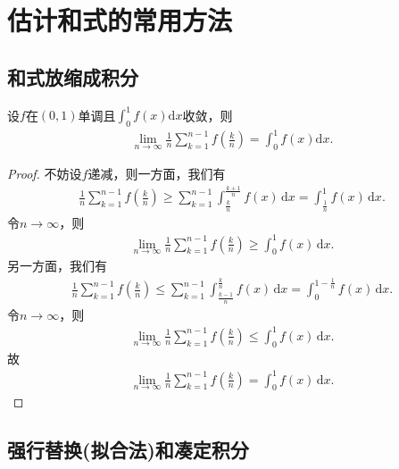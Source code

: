 \documentclass[../../main.tex]{subfiles}%
\begin{document}
\section{估计和式的常用方法}

\subsection{和式放缩成积分}

\begin{proposition}
设\(f\)在\((0,1)\)单调且\(\int_{0}^{1} f(x) \mathrm{d}x\)收敛，则
\begin{align*}
\lim_{n \to \infty} \frac{1}{n} \sum\limits_{k = 1}^{n - 1} f\left(\frac{k}{n}\right) = \int_{0}^{1} f(x)\mathrm{d}x.
\end{align*}
\end{proposition}
\begin{proof}

不妨设\(f\)递减，则一方面，我们有
\begin{align*}
\frac{1}{n}\sum\limits_{k=1}^{n-1}f\left(\frac{k}{n}\right) \geqslant \sum\limits_{k=1}^{n-1}\int_{\frac{k}{n}}^{\frac{k+1}{n}}f(x) \, \mathrm{d}x = \int_{\frac{1}{n}}^1 f(x) \, \mathrm{d}x.
\end{align*}
令\(n \to \infty\)，则
\begin{align*}
\lim_{n \to \infty} \frac{1}{n}\sum\limits_{k=1}^{n-1}f\left(\frac{k}{n}\right) \geqslant \int_0^1 f(x) \, \mathrm{d}x.
\end{align*}
另一方面，我们有
\begin{align*}
\frac{1}{n}\sum\limits_{k=1}^{n-1}f\left(\frac{k}{n}\right) \leqslant \sum\limits_{k=1}^{n-1}\int_{\frac{k-1}{n}}^{\frac{k}{n}}f(x) \, \mathrm{d}x = \int_{0}^{1-\frac{1}{n}} f(x) \, \mathrm{d}x.
\end{align*}
令\(n \to \infty\)，则
\begin{align*}
\lim_{n \to \infty} \frac{1}{n}\sum\limits_{k=1}^{n-1}f\left(\frac{k}{n}\right) \leqslant \int_0^1 f(x) \, \mathrm{d}x.
\end{align*}
故
\begin{align*}
\lim_{n \to \infty} \frac{1}{n}\sum\limits_{k=1}^{n-1}f\left(\frac{k}{n}\right) = \int_0^1 f(x) \, \mathrm{d}x.
\end{align*}

\end{proof}

\subsection{强行替换(拟合法)和凑定积分}\label{强行替换(拟合法)和凑定积分}
\end{document}
